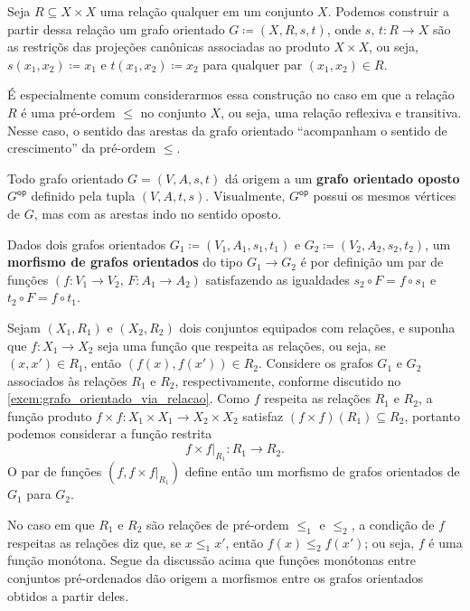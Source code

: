 \begin{exem}\label{exem:grafo_orientado_via_relacao}
    Seja $R \subseteq X \times X$ uma relação qualquer em um conjunto $X$.
    Podemos construir a partir dessa relação um grafo orientado $G \coloneqq (X,R,s,t)$, onde $s,\,t: R \to X$ são as restriçõs das projeções canônicas associadas ao produto $X \times X$, ou seja, $s(x_1,x_2) \coloneqq x_1$ e $t(x_1,x_2) \coloneqq x_2$ para qualquer par $(x_1,x_2) \in R$.

    É especialmente comum considerarmos essa construção no caso em que a relação $R$ é uma pré-ordem $\leq$ no conjunto $X$, ou seja, uma relação reflexiva e transitiva.
    Nesse caso, o sentido das arestas da grafo orientado ``acompanham o sentido de crescimento'' da pré-ordem $\leq$.
\end{exem}

\begin{exem}\label{exem:grafo_orientado_oposto}
    Todo grafo orientado $G=(V,A,s,t)$ dá origem a um \textbf{grafo orientado oposto} $G^{\mathsf{op}}$ definido pela tupla $(V,A,t,s)$.
    Visualmente, $G^{\mathsf{op}}$ possui os mesmos vértices de $G$, mas com as arestas indo no sentido oposto.
\end{exem}

\begin{defin}\label{defin:morfismo_grafos_orientados}
    Dados dois grafos orientados $G_1 \coloneqq (V_1,A_1,s_1,t_1)$ e $G_2 \coloneqq (V_2,A_2,s_2,t_2)$, um \textbf{morfismo de grafos orientados} do tipo $G_1 \to G_2$ é por definição um par de funções $(f: V_1 \to V_2,\, F: A_1 \to A_2)$ satisfazendo as igualdades $s_2 \circ F = f \circ s_1$ e $t_2 \circ F = f \circ t_1$.
\end{defin}

\begin{exem}
    Sejam $(X_1,R_1)$ e $(X_2,R_2)$ dois conjuntos equipados com relações, e suponha que $f: X_1 \to X_2$ seja uma função que respeita as relações, ou seja, se $(x,x') \in R_1$, então $(f(x),f(x')) \in R_2$.
    Considere os grafos $G_1$ e $G_2$ associados às relações $R_1$ e $R_2$, respectivamente, conforme discutido no \cref{exem:grafo_orientado_via_relacao}.
    Como $f$ respeita as relações $R_1$ e $R_2$, a função produto $f \times f: X_1 \times X_1 \to X_2 \times X_2$ satisfaz $(f \times f)(R_1) \subseteq R_2$, portanto podemos considerar a função restrita
    \begin{displaymath}
        f \times f \rvert_{R_1}: R_1 \to R_2.
    \end{displaymath}
    O par de funções $(f,f \times f\rvert_{R_1})$ define então um morfismo de grafos orientados de $G_1$ para $G_2$.

    No caso em que $R_1$ e $R_2$ são relações de pré-ordem $\leq_1$ e $\leq_2$, a condição de $f$ respeitas as relações diz que, se $x \leq_1 x'$, então $f(x) \leq_2 f(x')$; ou seja, $f$ é uma função monótona.
    Segue da discussão acima que funções monótonas entre conjuntos pré-ordenados dão origem a morfismos entre os grafos orientados obtidos a partir deles.
\end{exem}